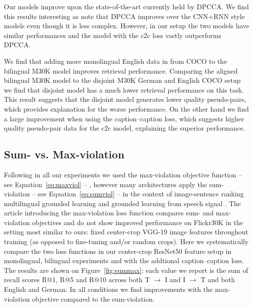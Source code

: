 Our models improve upon the state-of-the-art currently
held by DPCCA. We find this results interesting as 
\cite{rajendran2015bridge} note that DPCCA improves over the
CNN+RNN style models even though it is less complex. However,
in our setup the two models have similar performances and the
model with the c2c loss vastly outperforms DPCCA. 

We find that adding more monolingual English data
in from COCO to the bilingual M30K model improves retrieval
performance. Comparing the aligned bilingual M30K model to the disjoint M30K German and 
English COCO setup we find that disjoint model has a much lower retrieval performance on
this task. This result suggests that the disjoint model generates lower quality pseudo-pairs,
which provides explanation for the worse performance. On the other hand we find a large  
improvement when using the caption--caption loss, which suggests higher quality pseudo-pair 
data for the c2c model, explaining the superior performance.

\subsection{Sum- vs. Max-violation}


Following \cite{kadar2018conll} in all our experiments we used the max-violation 
objective function -- see Equation~\ref{eq:maxviol} -- , however many architectures apply
the sum-violation -- see Equation~\ref{eq:sumviol} --  in the context of image-sentence 
ranking \cite{nam2017dual} multilingual grounded learning \cite{gella2017image} and 
grounded learning from speech signal \cite{chrupala2017representations}. The article
introducing the max-violation loss function \cite{faghri2017vse++} compares sum- and 
max-violation objectives and do not show improved performance on Flickr30K 
in the setting most similar to
ours: fixed center-crop VGG-19 image features throughout training (as opposed to fine-tuning 
and/or random crops). Here we systematically compare the two loss functions 
in our center-crop 
ResNet50 feature setup in monolingual, bilingual experiments and with the addtional 
caption--caption loss.  The results are shown on Figure~\ref{fig:summax}: each 
value we report is the sum of recall scores R@1, R@5 and R@10
across both T $\rightarrow$ I and I $\rightarrow$ T and both
English and German.
In all conditions we find improvements with the max-violation objective
compared to the sum-violation.

